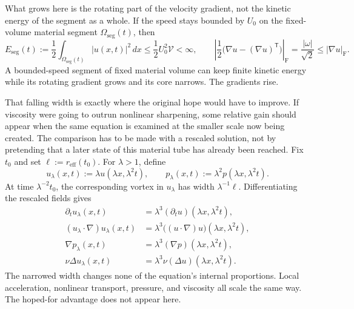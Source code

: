 What grows here is the rotating part of the velocity gradient, not the kinetic energy of the segment as a whole.
If the speed stays bounded by \(U_0\) on the fixed-volume material segment \(\Omega_{\mathrm{seg}}(t)\), then
\[
  E_{\mathrm{seg}}(t)
  :=
  \frac12\int_{\Omega_{\mathrm{seg}}(t)}|u(x,t)|^2\,dx
  \leq
  \frac12U_0^2\mathcal V
  <
  \infty,
  \qquad
  \left|\frac12\bigl(\nabla u-(\nabla u)^{\mathsf T}\bigr)\right|_{\mathrm F}
  =
  \frac{|\omega|}{\sqrt2}
  \leq
  |\nabla u|_{\mathrm F}.
\]
A bounded-speed segment of fixed material volume can keep finite kinetic energy while its rotating gradient grows and its core narrows.
The gradients rise.


That falling width is exactly where the original hope would have to improve.
If viscosity were going to outrun nonlinear sharpening, some relative gain should appear when the same equation is examined at the smaller scale now being created.
The comparison has to be made with a rescaled solution, not by pretending that a later state of this material tube has already been reached.
Fix \(t_0\) and set \(\ell:=r_{\mathrm{eff}}(t_0)\).
For \(\lambda>1\), define
\[
  u_\lambda(x,t)
  :=
  \lambda u(\lambda x,\lambda^2t),
  \qquad
  p_\lambda(x,t)
  :=
  \lambda^2p(\lambda x,\lambda^2t).
\]
At time \(\lambda^{-2}t_0\), the corresponding vortex in \(u_\lambda\) has width \(\lambda^{-1}\ell\).
Differentiating the rescaled fields gives
\[
\begin{aligned}
  \partial_tu_\lambda(x,t)
  &=
  \lambda^3(\partial_tu)(\lambda x,\lambda^2t),
  \\
  (u_\lambda\cdot\nabla)u_\lambda(x,t)
  &=
  \lambda^3\bigl((u\cdot\nabla)u\bigr)(\lambda x,\lambda^2t),
  \\
  \nabla p_\lambda(x,t)
  &=
  \lambda^3(\nabla p)(\lambda x,\lambda^2t),
  \\
  \nu\Delta u_\lambda(x,t)
  &=
  \lambda^3\nu(\Delta u)(\lambda x,\lambda^2t).
\end{aligned}
\]
The narrowed width changes none of the equation's internal proportions.
Local acceleration, nonlinear transport, pressure, and viscosity all scale the same way.
The hoped-for advantage does not appear here.


